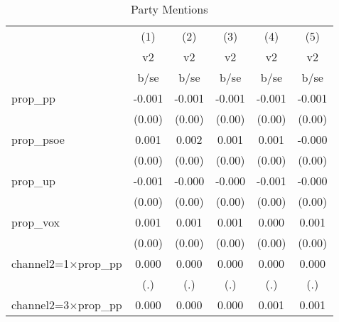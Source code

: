 \begin{table}[htbp]\centering
\def\sym#1{\ifmmode^{#1}\else\(^{#1}\)\fi}
\caption{Party Mentions \label{table\_pol }}
\begin{tabular}{l*{5}{c}}
\toprule
                    &\multicolumn{1}{c}{(1)}&\multicolumn{1}{c}{(2)}&\multicolumn{1}{c}{(3)}&\multicolumn{1}{c}{(4)}&\multicolumn{1}{c}{(5)}\\
                    &\multicolumn{1}{c}{v2}&\multicolumn{1}{c}{v2}&\multicolumn{1}{c}{v2}&\multicolumn{1}{c}{v2}&\multicolumn{1}{c}{v2}\\
                    &        b/se         &        b/se         &        b/se         &        b/se         &        b/se         \\
\midrule
prop\_pp             &      -0.001         &      -0.001         &      -0.001         &      -0.001         &      -0.001         \\
                    &      (0.00)         &      (0.00)         &      (0.00)         &      (0.00)         &      (0.00)         \\
prop\_psoe           &       0.001         &       0.002         &       0.001         &       0.001         &      -0.000         \\
                    &      (0.00)         &      (0.00)         &      (0.00)         &      (0.00)         &      (0.00)         \\
prop\_up             &      -0.001         &      -0.000         &      -0.000         &      -0.001         &      -0.000         \\
                    &      (0.00)         &      (0.00)         &      (0.00)         &      (0.00)         &      (0.00)         \\
prop\_vox            &       0.001         &       0.001         &       0.001         &       0.000         &       0.001         \\
                    &      (0.00)         &      (0.00)         &      (0.00)         &      (0.00)         &      (0.00)         \\
channel2=1$\times$prop\_pp&       0.000         &       0.000         &       0.000         &       0.000         &       0.000         \\
                    &         (.)         &         (.)         &         (.)         &         (.)         &         (.)         \\
channel2=3$\times$prop\_pp&       0.000         &       0.000         &       0.000         &       0.001         &       0.001         \\

\end{tabular}
\end{table}
